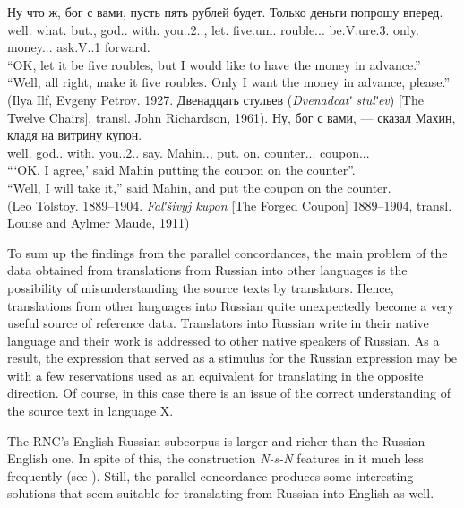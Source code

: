 \documentclass[output=paper]{langscibook}
\begin{document}
\ea\label{ex:mikhailov:16}
\ea\label{ex:mikhailov:16a}
\gll  Ну что ж, бог с вами, пусть пять рублей будет. Только деньги попрошу вперед.\\
     well.{\PTCP} what.{\PRON} but.{\PTCP}, god.{\NOUN}.{\NOM} with.{\PREP} you.{\PRON}.2.{\INSTR}.{\PL}, let.{\PTCP} five.{\NOUN}um.{\NOM} rouble.{\NOUN}.{\GEN}.{\PL} be.V.{\FUT}ure.3{\SG}. only.{\ADV} money.{\NOUN}.{\ACC}.{\PL} ask.V.{\FUT}.1{\SG} forward.{\ADV}\\
\glt  “OK, let it be five roubles, but I would like to have the money in advance.”\\
    “Well, all right, make it five roubles. Only I want the money in advance, please.” \\
 (Ilya Ilf, Evgeny Petrov. 1927. {Двенадцать стульев (\textit{Dvenadcatʹ stulʹev}) [The Twelve Chairs], transl. John Richardson, 1961).}
\ex\label{ex:mikhailov:16b}
\gll  Ну, бог с вами, --- сказал Махин, кладя на витрину купон.\\
     well.{\PTCP} god.{\NOUN}.{\NOM} with.{\PREP} you.{\PRON}.2.{\INSTR}.{\PL} say.{\PAST} Mahin.{\NOUNPROPER}.{\NOM}, put.{\GERUND} on.{\PREP} counter.{\NOUN}.{\ACC}.{\SG} coupon.{\NOUN}.{\ACC}.{\SG}\\
\glt      “‘OK, I agree,’ said Mahin putting the coupon on the counter”.\\
 “Well, I will take it,” said Mahin, and put the coupon on the counter.\\
(Leo Tolstoy. 1889--1904. \textit{Falʹšivyj kupon} [The Forged Coupon] 1889--1904, transl. Louise and Aylmer Maude, 1911)
\z
\z

To sum up the findings from the parallel concordances, the main problem of the data obtained from translations from Russian into other languages is the possibility of misunderstanding the source texts by translators. Hence, translations from other languages into Russian quite unexpectedly become a very useful source of reference data. Translators into Russian write in their native language and their work is addressed to other native speakers of Russian. As a result, the expression that served as a stimulus for the Russian expression may be with a few reservations used as an equivalent for translating in the opposite direction. Of course, in this case there is an issue of the correct understanding of the source text in language X.

The RNC’s English-Russian subcorpus is larger and richer than the Russian-English one. In spite of this, the construction \textit{N-s-N} features in it much less frequently (see ). Still, the parallel concordance produces some interesting solutions that seem suitable for translating from Russian into English as well.
\end{document}
